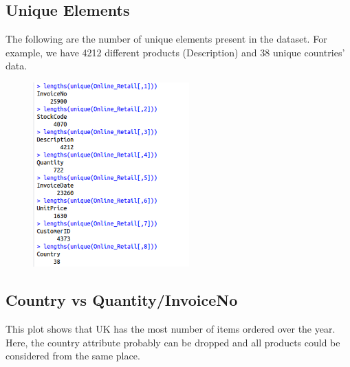 \documentclass{article}
\begin{document}
\subsection{Unique Elements} 
The following are the number of unique elements present in the dataset. For example, we have 4212 different products (Description) and 38 unique countries' data. 
\begin{figure}[H]
	\includegraphics[width=6cm]{da/unique.png} 
	\centering 
\end{figure} 

\subsection{Country vs Quantity/InvoiceNo} 
This plot shows that UK has the most number of items ordered over the year. Here, the country attribute probably can be dropped and all products could be considered from the same place. 
\end{document}
